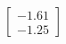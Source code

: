 \documentclass[preview]{standalone}
\begin{document}
\begin{align*}
\begin{bmatrix} -1.61 \\ -1.25 \end{bmatrix}
\end{align*}
\end{document}

